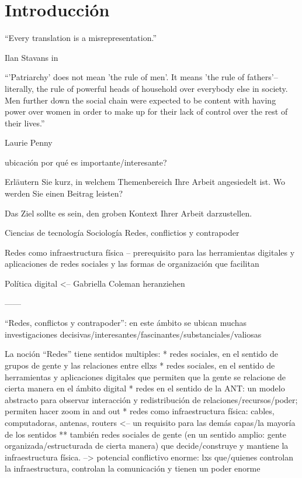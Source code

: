 \section{Introducción}

\epigraph{``Every translation is a misrepresentation.''}{Ilan Stavans in~\autocite{Albin2005}}
\epigraph{``'Patriarchy' does not mean 'the rule of men'. It means 'the rule of fathers'--literally, the rule of powerful heads of household over everybody else in society. Men further down the social chain were expected to be content with having power over women in order to make up for their lack of control over the rest of their lives.''}{Laurie Penny~\autocite[69]{Penny2014}}

ubicación
por qué es importante/interesante?
	\item Erläutern Sie kurz, in welchem Themenbereich Ihre Arbeit angesiedelt ist. Wo werden Sie einen Beitrag leisten?
	\item Das Ziel sollte es sein, den groben Kontext Ihrer Arbeit darzustellen.

Ciencias de tecnología
Sociología
Redes, conflictios y contrapoder

Redes como infraestructura física -- prerequisito para las herramientas digitales y aplicaciones de redes sociales y las formas de organización que facilitan

Política digital <-- Gabriella Coleman heranziehen

------

``Redes, conflictos y contrapoder'': en este ámbito se ubican muchas investigaciones decisivas/interesantes/fascinantes/substanciales/valiosas

La noción ``Redes'' tiene sentidos multiples:
* redes sociales, en el sentido de grupos de gente y las relaciones entre ellxs
* redes sociales, en el sentido de herramientas y aplicaciones digitales que permiten que la gente se relacione de cierta manera en el ámbito digital
* redes en el sentido de la ANT: un modelo abstracto para observar interacción y redistribución de relaciones/recursos/poder; permiten hacer zoom in and out
* redes como infraestructura física: cables, computadoras, antenas, routers <-- un requisito para las demás capas/la mayoría de los sentidos
** también redes sociales de gente (en un sentido amplio: gente organizada/estructurada de cierta manera) que decide/construye y mantiene la infraestructura física.
--> potencial conflictivo enorme: lxs que/quienes controlan la infraestructura, controlan la comunicación y tienen un poder enorme

